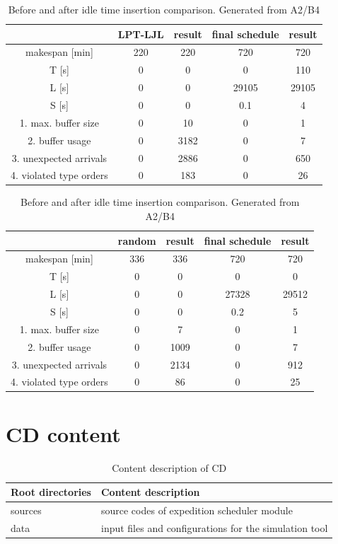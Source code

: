 \documentclass{ctuthesis}
\begin{document}
\begin{table}[H]
\begin{tabular}{ |c|| c | c | c | c |} 
\hline
 & LPT-LJL & result & final schedule & result \\ 
\hline
makespan [min] & 220 & 220 & 720 & 720 \\
\hline
T [s]& 0 & 0 & 0 & 110 \\
\hline
L [s]& 0 & 0 & 29105 & 29105 \\
\hline
S [s]& 0 & 0 & 0.1 & 4 \\
\hline
1. max. buffer size & 0 & 10 & 0 & 1\\ 
\hline
2. buffer usage  & 0 & 3182 & 0 & 7\\ 
\hline
3. unexpected arrivals & 0 & 2886 & 0 & 650\\ 
\hline
4. violated type orders & 0 & 183 & 0 & 26\\ 
\hline
\end{tabular}
\caption{Before and after idle time insertion comparison. Generated from A2/B4}
\end{table}

\begin{table}[H]
\begin{tabular}{ |c|| c | c | c | c |} 
\hline
 & random & result & final schedule & result \\ 
\hline
makespan [min] & 336 & 336 & 720 & 720 \\
\hline
T [s]& 0 & 0 & 0 & 0 \\
\hline
L [s]& 0 & 0 & 27328 & 29512 \\
\hline
S [s]& 0 & 0 & 0.2 & 5 \\
\hline
1. max. buffer size & 0 & 7 & 0 & 1\\ 
\hline
2. buffer usage  & 0 & 1009 & 0 & 7\\ 
\hline
3. unexpected arrivals & 0 & 2134 & 0 & 912\\ 
\hline
4. violated type orders & 0 & 86 & 0 & 25\\ 
\hline
\end{tabular}
\caption{Before and after idle time insertion comparison. Generated from A2/B4}
\end{table}

\chapter{CD content}

\begin{table}[H]
\begin{tabular}{  l  l } 
\hline
 \textbf{Root directories} & \textbf{Content description} \\ 
 \hline
sources & source codes of expedition scheduler module \\
data & input files and configurations for the simulation tool \\
\hline
\end{tabular}
\caption{Content description of CD}
\end{table}
\end{document}
